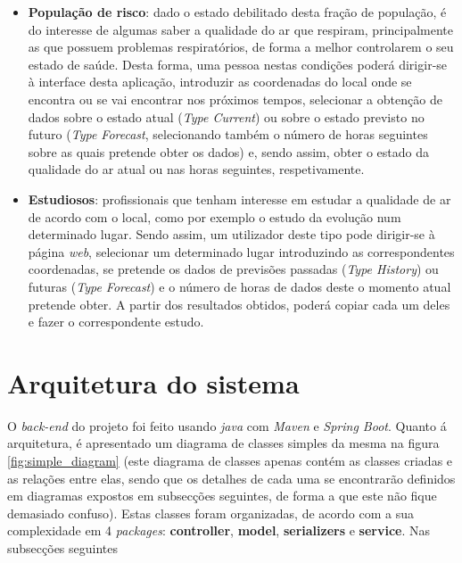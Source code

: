 \begin{itemize}
   \item \textbf{População de risco}: dado o estado debilitado desta fração de população, é do interesse 
de algumas saber a qualidade do ar que respiram, principalmente as que possuem problemas respiratórios, 
de forma a melhor controlarem o seu estado de saúde. Desta forma, uma pessoa nestas condições poderá dirigir-se
à interface desta aplicação, introduzir as coordenadas do local onde se encontra ou se vai encontrar nos próximos
tempos, selecionar a obtenção de dados sobre o estado atual (\textit{Type Current}) ou sobre o estado previsto no 
futuro (\textit{Type Forecast}, selecionando também o número de horas seguintes sobre as quais pretende obter os 
dados) e, sendo assim, obter o estado da qualidade do ar atual ou nas horas seguintes, respetivamente.
   \item \textbf{Estudiosos}: profissionais que tenham interesse em estudar a qualidade de ar de acordo com 
o local, como por exemplo o estudo da evolução num determinado lugar. Sendo assim, um utilizador deste tipo
pode dirigir-se à página \textit{web}, selecionar um determinado lugar introduzindo as correspondentes coordenadas,
se pretende os dados de previsões passadas (\textit{Type History}) ou futuras (\textit{Type Forecast}) e o 
número de horas de dados deste o momento atual pretende obter. A partir dos resultados obtidos, poderá copiar
cada um deles e fazer o correspondente estudo.
\end{itemize}


\section{Arquitetura do sistema}
O \textit{back-end} do projeto foi feito usando \textit{java} com \textit{Maven} e \textit{Spring Boot}.
Quanto á arquitetura, é apresentado um diagrama de classes simples da mesma na figura 
\ref{fig:simple_diagram} (este diagrama de classes apenas contém as classes criadas e as relações entre elas,
sendo que os detalhes de cada uma se encontrarão definidos em diagramas expostos em subsecções seguintes, 
de forma a que este não fique demasiado confuso). Estas classes foram organizadas, de acordo com 
a sua complexidade em 4 \textit{packages}: \textbf{controller}, \textbf{model}, \textbf{serializers} e 
\textbf{service}. Nas subsecções seguintes

